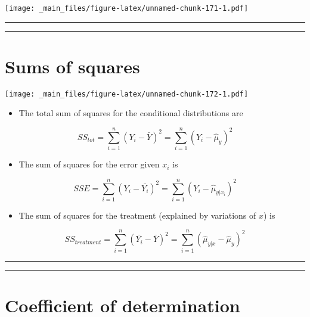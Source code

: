 \documentclass[
]{book}
\providecommand{\tightlist}{%
  \setlength{\itemsep}{0pt}\setlength{\parskip}{0pt}}
\begin{document}
\texttt{[image: \_main\_files/figure-latex/unnamed-chunk-171-1.pdf]}

\begin{center}\rule{0.5\linewidth}{0.5pt}\end{center}

\begin{center}\rule{0.5\linewidth}{0.5pt}\end{center}

\hypertarget{sums-of-squares}{%
\section{Sums of squares}\label{sums-of-squares}}

\texttt{[image: \_main\_files/figure-latex/unnamed-chunk-172-1.pdf]}

\begin{itemize}
\tightlist
\item
  The total sum of squares for the conditional distributions are
\end{itemize}

\[SS_{tot}=\sum_{i=1}^n(Y_i-\bar{Y})^2=\sum_{i=1}^n(Y_i -\hat{\mu}_y)^2\]

\begin{itemize}
\tightlist
\item
  The sum of squares for the error given \(x_i\) is
\end{itemize}

\[SSE=\sum_{i=1}^n(Y_i-\bar{Y_i})^2=\sum_{i=1}^n(Y_i-\hat{\mu}_{y|x_i})^2\]

\begin{itemize}
\tightlist
\item
  The sum of squares for the treatment (explained by variations of \(x\)) is
\end{itemize}

\[SS_{treatment}=\sum_{i=1}^n(\bar{Y_i}-\bar{Y})^2=\sum_{i=1}^n(\hat{\mu}_{y|x} -\hat{\mu}_y)^2\]

\begin{center}\rule{0.5\linewidth}{0.5pt}\end{center}

\begin{center}\rule{0.5\linewidth}{0.5pt}\end{center}

\hypertarget{coefficient-of-determination}{%
\section{Coefficient of determination}\label{coefficient-of-determination}}
\end{document}
